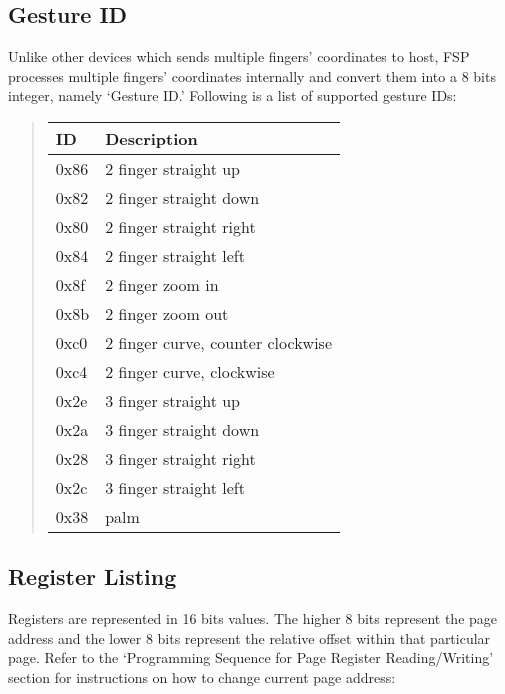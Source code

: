 \documentclass[a4paper,8pt,english]{sphinxmanual}
\begin{document}
\subsection{Gesture ID}
\label{input/devices/sentelic:gesture-id}
Unlike other devices which sends multiple fingers' coordinates to host,
FSP processes multiple fingers' coordinates internally and convert them
into a 8 bits integer, namely `Gesture ID.'  Following is a list of
supported gesture IDs:
\begin{quote}

\begin{tabulary}{\linewidth}{|L|L|}
\hline
\textsf{\relax 
ID
} & \textsf{\relax 
Description
}\\
\hline
0x86
 & 
2 finger straight up
\\
\hline
0x82
 & 
2 finger straight down
\\
\hline
0x80
 & 
2 finger straight right
\\
\hline
0x84
 & 
2 finger straight left
\\
\hline
0x8f
 & 
2 finger zoom in
\\
\hline
0x8b
 & 
2 finger zoom out
\\
\hline
0xc0
 & 
2 finger curve, counter clockwise
\\
\hline
0xc4
 & 
2 finger curve, clockwise
\\
\hline
0x2e
 & 
3 finger straight up
\\
\hline
0x2a
 & 
3 finger straight down
\\
\hline
0x28
 & 
3 finger straight right
\\
\hline
0x2c
 & 
3 finger straight left
\\
\hline
0x38
 & 
palm
\\
\hline\end{tabulary}

\end{quote}


\subsection{Register Listing}
\label{input/devices/sentelic:register-listing}
Registers are represented in 16 bits values. The higher 8 bits represent
the page address and the lower 8 bits represent the relative offset within
that particular page.  Refer to the `Programming Sequence for Page Register
Reading/Writing' section for instructions on how to change current page
address:
\end{document}
